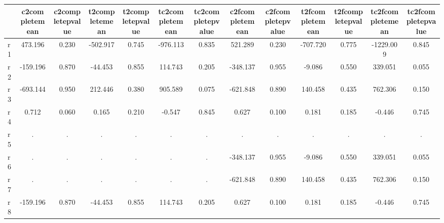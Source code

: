 \begin{table}[htbp]
\begin{tabular}{lcccccccccccc} \hline \hline
 & c2completemean  & c2completepvalue  & t2completemean  & t2completepvalue  & tc2completemean  & tc2completepvalue  & c2fcompletemean  & c2fcompletepvalue  & t2fcompletemean  & t2fcompletepvalue  & tc2fcompletemean  & tc2fcompletepvalue  \\  \hline 
r1 &   473.196 &     0.230 &  -502.917 &     0.745 &  -976.113 &     0.835 &   521.289 &     0.230 &  -707.720 &     0.775 & -1229.009 &     0.845 \\  
r2 &  -159.196 &     0.870 &   -44.453 &     0.855 &   114.743 &     0.205 &  -348.137 &     0.955 &    -9.086 &     0.550 &   339.051 &     0.055 \\  
r3 &  -693.144 &     0.950 &   212.446 &     0.380 &   905.589 &     0.075 &  -621.848 &     0.890 &   140.458 &     0.435 &   762.306 &     0.150 \\  
r4 &     0.712 &     0.060 &     0.165 &     0.210 &    -0.547 &     0.845 &     0.627 &     0.100 &     0.181 &     0.185 &    -0.446 &     0.745 \\  
r5 &         . &         . &         . &         . &         . &         . &         . &         . &         . &         . &         . &         . \\  
r6 &         . &         . &         . &         . &         . &         . &  -348.137 &     0.955 &    -9.086 &     0.550 &   339.051 &     0.055 \\  
r7 &         . &         . &         . &         . &         . &         . &  -621.848 &     0.890 &   140.458 &     0.435 &   762.306 &     0.150 \\  
r8 &  -159.196 &     0.870 &   -44.453 &     0.855 &   114.743 &     0.205 &     0.627 &     0.100 &     0.181 &     0.185 &    -0.446 &     0.745 \\  
\hline \hline \end{tabular}
\end{table}
